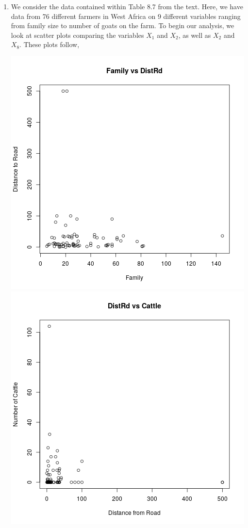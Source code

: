 \documentclass[letterpaper,10pt]{article}
\begin{document}
\begin{enumerate}
\item We consider the data contained within Table 8.7 from the text. Here, we have data from 76 different farmers in West Africa on 9 different variables ranging from family size to number of goats on the farm. To begin our analysis, we look at scatter plots comparing the variables $X_1$ and $X_2$, as well as $X_2$ and $X_8$. These plots follow,
\begin{center}
\includegraphics[scale=.5]{famdistscatter.png}
\includegraphics[scale=.5]{distcattlescatter.png}

\end{center}
\end{enumerate}
\end{document}
